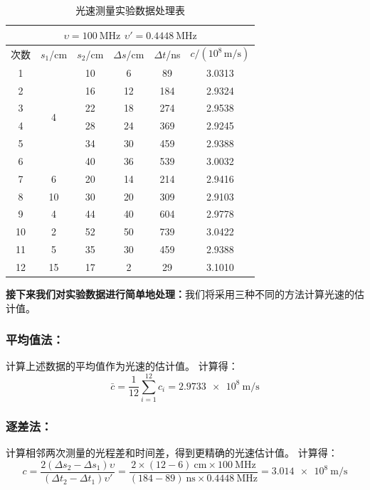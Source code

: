 \documentclass[]{../../templates/Report}%
\begin{document}
\begin{table}[H]
    \centering
    \caption{光速测量实验数据处理表}
    \renewcommand{\arraystretch}{1.3}
    \setlength{\tabcolsep}{8pt}
    \begin{tabular}{|c|c|c|c|c|c|}
        \hline
        \multicolumn{6}{|c|}{\textbf{$\upsilon = 100\ \mathrm{MHz}$ \quad $\upsilon' = 0.4448\ \mathrm{MHz}$}} \\
        \hline
        次数 & $s_1$/cm & $s_2$/cm & $\Delta s$/cm & $\Delta t$/ns & $c/(10^8\,\mathrm{m}/\mathrm{s})$ \\
        \hline
        1  & \multirow{6}{*}{4}  & 10 & 6  & 89  & 3.0313 \\
        2  &                      & 16 & 12 & 184 & 2.9324 \\
        3  &                      & 22 & 18 & 274 & 2.9538 \\
        4  &                      & 28 & 24 & 369 & 2.9245 \\
        5  &                      & 34 & 30 & 459 & 2.9388 \\
        6  &                      & 40 & 36 & 539 & 3.0032 \\
        \hline
        7  & 6  & 20 & 14 & 214 & 2.9416 \\
        8  & 10 & 30 & 20 & 309 & 2.9103 \\
        9  & 4  & 44 & 40 & 604 & 2.9778 \\
        10 & 2  & 52 & 50 & 739 & 3.0422 \\
        11 & 5  & 35 & 30 & 459 & 2.9388 \\
        12 & 15 & 17 & 2  & 29  & 3.1010 \\
        \hline
    \end{tabular}
\end{table}

\textbf{接下来我们对实验数据进行简单地处理：}我们将采用三种不同的方法计算光速的估计值。
\subsubsection{平均值法：}计算上述数据的平均值作为光速的估计值。
计算得：
\begin{equation}
    \bar{c} = \frac{1}{12} \sum_{i=1}^{12} c_i = \SI{2.9733e8}{\meter\per\second}
\end{equation}
\subsubsection{逐差法：}计算相邻两次测量的光程差和时间差，得到更精确的光速估计值。
计算得：
\begin{equation}
    c = \frac{2(\Delta s_2 - \Delta s_1)\upsilon }{(\Delta t_2 - \Delta t_1) \upsilon '} = \frac{2 \times (12 - 6)\ \unit{\centi\meter} \times \SI{100}{\mega\hertz}}{ (184 - 89)\ \unit{\nano\second} \times \SI{0.4448}{\mega\hertz}} = \SI{3.014e8}{\meter\per\second}
\end{equation}
\end{document}
